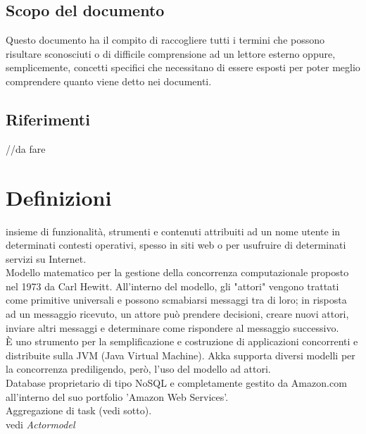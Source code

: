 \documentclass{scalatekids-article}
\begin{document}
\subsection{Scopo del documento}
Questo documento ha il compito di raccogliere tutti i termini che possono risultare sconosciuti o di difficile comprensione ad un lettore esterno oppure, semplicemente, concetti specifici che necessitano di essere esposti per poter meglio comprendere quanto viene detto nei documenti.
\subsection{Riferimenti} //da fare
\newpage
\section{Definizioni}


 insieme di funzionalità, strumenti e contenuti attribuiti ad un nome utente in determinati contesti operativi, spesso in siti web o per usufruire di determinati servizi su Internet.
\\

 Modello matematico per la gestione della concorrenza computazionale proposto nel 1973 da Carl Hewitt.
All'interno del modello, gli "attori" vengono trattati come primitive universali e possono scmabiarsi messaggi tra di loro; in risposta ad un messaggio ricevuto, un attore può prendere decisioni, creare nuovi attori, inviare altri messaggi e determinare come rispondere al messaggio successivo.
\\

 È uno strumento per la semplificazione e costruzione di applicazioni concorrenti e distribuite sulla JVM (Java Virtual Machine). Akka supporta diversi modelli per la concorrenza prediligendo, però, l'uso del modello ad attori.
\\

 Database proprietario di tipo NoSQL e completamente gestito da Amazon.com all'interno del suo portfolio 'Amazon Web Services'.
\\

 Aggregazione di task (vedi sotto).
\\

  vedi \textit{Actormodel}
\\

\end{document}
